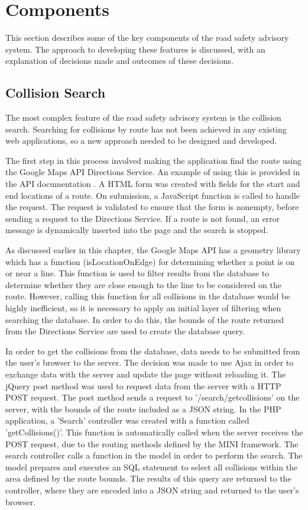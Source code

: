 \documentclass[authoryearcitations]{UoYCSproject}
\begin{document}
\section{Components}

This section describes some of the key components of the road safety advisory system. The approach to developing these features is discussed, with an explanation of decisions made and outcomes of these decisions. 

\subsection{Collision Search}

The most complex feature of the road safety advisory system is the collision search. Searching for collisions by route has not been achieved in any existing web applications, so a new approach needed to be designed and developed. 

The first step in this process involved making the application find the route using the Google Maps API Directions Service. An example of using this is provided in the API documentation \citep{Google}. A HTML form was created with fields for the start and end locations of a route. On submission, a JavaScript function is called to handle the request. The request is validated to ensure that the form is nonempty, before sending a request to the Directions Service. If a route is not found, an error message is dynamically inserted into the page and the search is stopped. 

As discussed earlier in this chapter, the Google Maps API has a geometry library which has a function (isLocationOnEdge) for determining whether a point is on or near a line. This function is used to filter results from the database to determine whether they are close enough to the line to be considered on the route. However, calling this function for all collisions in the database would be highly inefficient, so it is necessary to apply an initial layer of filtering when searching the database. In order to do this, the bounds of the route returned from the Directions Service are used to create the database query. 

In order to get the collisions from the database, data needs to be submitted from the user's browser to the server. The decision was made to use Ajax in order to exchange data with the server and update the page without reloading it. The jQuery \citep{ThejQueryFoundation} post method was used to request data from the server with a HTTP POST request. The post method sends a request to '/search/getcollisions' on the server, with the bounds of the route included as a JSON string. In the PHP application, a 'Search' controller was created with a function called 'getCollisions()'. This function is automatically called when the server receives the POST request, due to the routing methods defined by the MINI framework. The search controller calls a function in the model in order to perform the search. The model prepares and executes an SQL statement to select all collisions within the area defined by the route bounds. The results of this query are returned to the controller, where they are encoded into a JSON string and returned to the user's browser.
\end{document}
